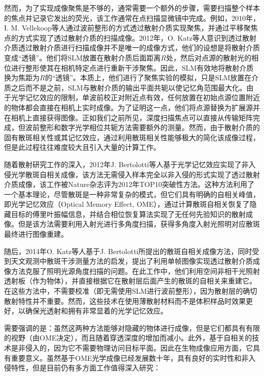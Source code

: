 然而，为了实现成像聚焦是不够的，通常需要一个额外的步骤，需要扫描整个样本的焦点并记录它发出的荧光，该工作通常在点扫描显微镜中完成。例如，2010年，I. M. Vellekoop等人\cite{vellekoop_scattered_2010}通过波前整形的方式透过散射介质实现聚焦，并通过平移聚焦点的方式实现了透过散射介质的扫描成像。2012年，O. Katz等人\cite{katz_looking_2012}意识到透过散射介质透过散射介质进行扫描成像并不是唯一的成像方式，他们的设想是将散射介质变成“透镜”。他们将SLM放置在散射介质后面距离$R$处，然后对点源的散射光的相位进行整形使其在相机特定点进行重新干涉聚焦。因此，SLM有效地将散射介质换为焦距为$R$的“透镜”。本质上，他们进行了聚焦实验的模拟，只是SLM放置在介质之后而不是之前，SLM与散射介质的输出平面共轭以使记忆角范围最大化。由于光学记忆效应的限制，单波前校正对附近点有效，任何放置在初始点源位置附近的物体都会直接在相机上实时成像。为了证明这一点，他们将点源替换为扩展源并在相机上直接获得图像。正如我们之前所见，深度扫描焦点可以直接从传输矩阵完成，但波前整形和数字光学相位共轭方法需要额外的测量。然而，由于散射介质的固有散斑相关性或其记忆效应，通过利用散斑相关性能够极大的简化该成像过程，但是此过程往往难度较大且引入大量的计算工作。

随着散射研究工作的深入，2012年J. Bertolotti等人\cite{bertolotti_non-invasive_2012}基于光学记忆效应实现了非入侵光学散斑自相关成像，该方法无需侵入样本完全以非入侵的形式实现了透过散射介质成像，该工作被Nature杂志评为2012年TOP10突破性方法。这种方法利用了一个基本理论，尽管散斑是一种非常复杂的模式，但它们具有明确的自相关峰值，即光学记忆效应（Optical Memory Effect, OME）\cite{Freund1988}，通过计算散斑自相关恢复了隐藏目标的傅里叶振幅信息，并结合相位恢复算法实现了无任何先验知识的散射成像。但是该方法需要利用入射光进行多角度扫描，获得多角度入射光照明对应散斑最终进行图像重建。

随后，2014年O. Katz等人\cite{katz_non-invasive_2014}基于J. Bertolotti所提出的散斑自相关成像方法，同时受到天文观测中散斑干涉测量方法的启发，提出了利用单帧图像实现透过散射介质成像方法克服了照明光源角度扫描的问题。在此工作中，他们利用空间非相干光照射透射板（作为物体），并直接根据它在散射层后面产生的散斑的自相关来重建它。在这些方法中，不需要校准（即无需使用SLM进行波前整形），因为散射层的确切散射特性并不重要。然而，这些技术在使用薄散射材料而不是体积样品时效果更好，以确保光透射和拥有非常显着的光学记忆效应。

需要强调的是：虽然这两种方法\cite{bertolotti_non-invasive_2012,katz_non-invasive_2014}能够对隐藏的物体进行成像，但是它们都具有有限的视野（由OME决定），而且随着穿透深度的增加而减小。此外，基于自相关的技术是非侵入的，因为它不需要物理访问目标平面。因此在生物成像应用方面，它具有重要意义。虽然基于OME光学成像已经发展数十年，具有良好的实时性和非入侵特性，但是目前仍有多方面工作值得深入研究：

